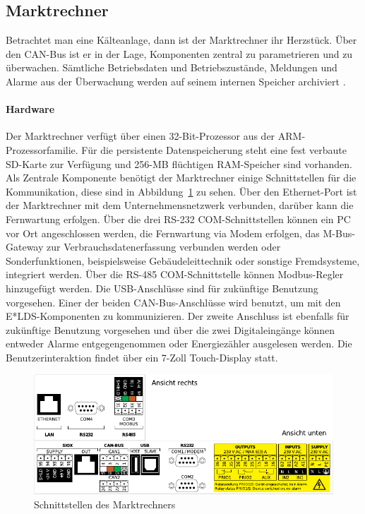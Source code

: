 \documentclass[11pt,a4paper]{report}
\begin{document}
\subsection{Marktrechner} \label{sec:marktrechner} 
Betrachtet man eine Kälteanlage, dann ist der Marktrechner ihr Herzstück. Über den CAN-Bus ist er in der Lage, Komponenten zentral zu parametrieren und zu überwachen. Sämtliche Betriebsdaten und Betriebszustände, Meldungen und Alarme aus der Überwachung werden auf seinem internen Speicher archiviert \cite{elds}.

\paragraph{Hardware} Der Marktrechner verfügt über einen 32-Bit-Prozessor aus der ARM-Prozessorfamilie. Für die persistente Datenspeicherung steht eine fest verbaute SD-Karte zur Verfügung und 256-MB flüchtigen RAM-Speicher sind vorhanden. Als Zentrale Komponente benötigt der Marktrechner einige Schnittstellen für die Kommunikation, diese sind in Abbildung~\ref{fig:marktrechner_interfaces} zu sehen. Über den Ethernet-Port ist der Marktrechner mit dem Unternehmensnetzwerk verbunden, darüber kann die Fernwartung erfolgen. Über die drei RS-232 COM-Schnittstellen können ein PC vor Ort angeschlossen werden, die Fernwartung via Modem erfolgen, das M-Bus-Gateway zur Verbrauchsdatenerfassung verbunden werden oder Sonderfunktionen, beispielsweise Gebäudeleittechnik oder sonstige Fremdsysteme, integriert werden. Über die RS-485 COM-Schnittstelle können Modbus-Regler hinzugefügt werden. Die USB-Anschlüsse sind für zukünftige Benutzung vorgesehen. Einer der beiden CAN-Bus-Anschlüsse wird benutzt, um mit den E*LDS-Komponenten zu kommunizieren. Der zweite Anschluss ist ebenfalls für zukünftige Benutzung vorgesehen und über die zwei Digitaleingänge können entweder Alarme entgegengenommen oder Energiezähler ausgelesen werden. Die Benutzerinteraktion findet über ein 7-Zoll Touch-Display statt.

\begin{figure}[htbp]
\centering
\includegraphics[scale=1.1]{images/CI4000_Hardware_Sticker.pdf}
\caption{Schnittstellen des Marktrechners}
\label{fig:marktrechner_interfaces}
\end{figure}
\end{document}
